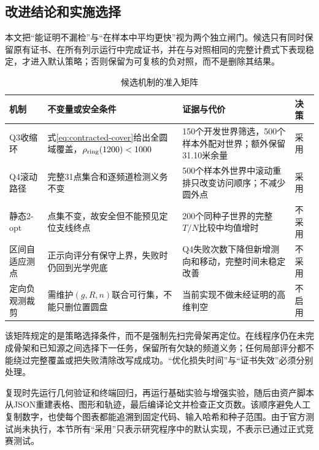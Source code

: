 \subsection{改进结论和实施选择}
本文把“能证明不漏检”与“在样本中平均更快”视为两个独立闸门。候选只有同时保留原有证书、在所有列示运行中完成证书，并在与对照相同的完整计费式下表现稳定，才进入默认策略；否则保留为可复核的负对照，而不是删除其结果。
\begin{table}[H]\centering\small
\caption{候选机制的准入矩阵}
\begin{tabular}{>{\raggedright\arraybackslash}p{2.7cm}>{\raggedright\arraybackslash}p{4.1cm}>{\raggedright\arraybackslash}p{4.9cm}>{\raggedright\arraybackslash}p{1.3cm}}\toprule
机制 & 不变量或安全条件 & 证据与代价 & 决策\\\midrule
Q3收缩环 & 式\eqref{eq:contracted-cover}给出全圆域覆盖，$\rho_{\rm ring}(1200)<1000$ & 150个开发世界筛选，500个样本外配对世界；额外保留31.10米余量 & 采用\\
Q4滚动路径 & 完整31点集合和逐频道检测义务不变 & 500个样本外世界中滚动重排只改变访问顺序；不减少圆外点 & 采用\\
静态2-opt & 点集不变，故安全但不能预见定位支线终点 & 200个同种子世界的完整$T/N$比较中均值增时 & 不采用\\
区间自适应测点 & 正示向评分有保守上界，失败时仍回到光学兜底 & Q4失败次数下降但新增测向和移动，完整时间未稳定改善 & 不采用\\
定向负观测裁剪 & 需维护$(g,R,n)$联合可行集，不能只删位置圆盘 & 当前实现不做未经证明的高维判空 & 不启用\\\bottomrule
\end{tabular}
\end{table}
该矩阵规定的是策略选择条件，而不是强制先扫完骨架再定位。在线程序仍在未完成骨架和已知源之间选择下一任务，保留所有欠缺的频道义务；任何局部评分都不能绕过完整覆盖或把失败清除改写成成功。“优化损失时间”与“证书失效”必须分别处理。

复现时先运行几何验证和终端回归，再运行基础实验与增强实验，随后由资产脚本从JSON重建表格、图形和轨迹，最后编译论文并检查正文页数。该顺序避免人工复制数字，也使每个图表都能追溯到固定代码、输入哈希和种子范围。由于官方测试尚未执行，本节所有“采用”只表示研究程序中的默认实现，不表示已通过正式竞赛测试。
